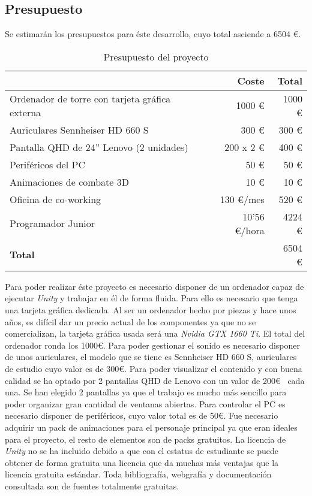 \subsection{Presupuesto}

Se estimarán los presupuestos para éste desarrollo, cuyo total asciende a 6504 \euro.

\begin{table}[H]
    \centering
    \begin{tabular}{|p{8cm}|r|r|}
      \hline
       & \textbf{Coste} & \textbf{Total} \\
      \hline
      Ordenador de torre con tarjeta gráfica externa  & 1000 \euro & 1000 \euro \\
      Auriculares Sennheiser HD 660 S & 300 \euro & 300 \euro \\
      Pantalla QHD de 24'' Lenovo (2 unidades) & 200 x 2 \euro & 400 \euro\\
      Periféricos del PC & 50 \euro & 50 \euro \\
      Animaciones de combate 3D & 10 \euro & 10 \euro \\
      Oficina de co-working & 130 \euro /mes & 520 \euro \\
      Programador Junior & 10'56 \euro /hora & 4224 \euro \\
      \hline
                                     \textbf{Total} & & 6504 \euro \\
      \hline
    \end{tabular}
    \caption{Presupuesto del proyecto}
    \label{tab:presupuesto1}
  \end{table}

Para poder realizar éste proyecto es necesario disponer de un ordenador capaz de ejecutar \textit{Unity} y trabajar en él de forma fluida. Para ello es necesario que tenga una tarjeta gráfica dedicada. Al ser un ordenador hecho por piezas y hace unos años, es difícil dar un precio actual de los componentes ya que no se comercializan, la tarjeta gráfica usada será una \textit{Nvidia GTX 1660 Ti}. El total del ordenador ronda los 1000\euro. Para poder gestionar el sonido es necesario disponer de unos auriculares, el modelo que se tiene es Sennheiser HD 660 S, auriculares de estudio cuyo valor es de 300\euro. Para poder visualizar el contenido y con buena calidad se ha optado por 2 pantallas QHD de Lenovo con un valor de 200\euro~  cada una. Se han elegido 2 pantallas ya que el trabajo es mucho más sencillo para poder organizar gran cantidad de ventanas abiertas. Para controlar el PC es necesario disponer de periféricos, cuyo valor total es de 50\euro. Fue necesario adquirir un pack de animaciones para el personaje principal ya que eran ideales para el proyecto, el resto de elementos son de packs gratuitos. La licencia de \textit{Unity} no se ha incluido debido a que con el estatus de estudiante se puede obtener de forma gratuita una licencia que da muchas más ventajas que la licencia gratuita estándar. Toda bibliografía, webgrafía y documentación consultada son de fuentes totalmente gratuitas.

